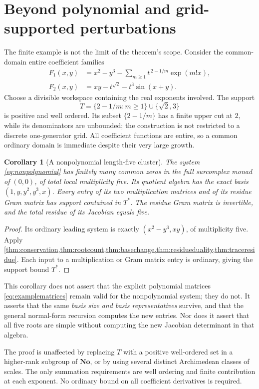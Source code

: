 \documentclass[11pt]{article}
\newtheorem{corollary}[theorem]{Corollary}
\theoremstyle{definition}
\newcommand{\No}{\mathbf{No}}
\begin{document}
\section{Beyond polynomial and grid-supported perturbations}\label{sec:nonpolynomial}
The finite example is not the limit of the theorem's scope. Consider the common-domain entire coefficient families
\begin{align}\label{eq:nonpolynomial}
 F_1(x,y)&=x^2-y^3-
      \sum_{m\ge1}t^{\,2-1/m}\exp(m!x),\\
 F_2(x,y)&=xy-t^{\sqrt2}-t^3\sin(x+y).\nonumber
\end{align}
Choose a divisible workspace containing the real exponents involved. The support
\[
 T=\{2-1/m:m\ge1\}\cup\{\sqrt2,3\}
\]
is positive and well ordered. Its subset $\{2-1/m\}$ has a finite upper cut at $2$, while its denominators are unbounded; the construction is not restricted to a discrete one-generator grid. All coefficient functions are entire, so a common ordinary domain is immediate despite their very large growth.

\begin{corollary}[A nonpolynomial length-five cluster]\label{cor:nonpolynomial}
The system \eqref{eq:nonpolynomial} has finitely many common zeros in the full surcomplex monad of $(0,0)$, of total local multiplicity five. Its quotient algebra has the exact basis $(1,y,y^2,y^3,x)$. Every entry of its two multiplication matrices and of its residue Gram matrix has support contained in $T^*$. The residue Gram matrix is invertible, and the total residue of its Jacobian equals five.
\end{corollary}
\begin{proof}
Its ordinary leading system is exactly $(x^2-y^3,xy)$, of multiplicity five. Apply \cref{thm:conservation,thm:rootcount,thm:basechange,thm:residueduality,thm:traceresidue}. Each input to a multiplication or Gram matrix entry is ordinary, giving the support bound $T^*$.
\end{proof}
This corollary does not assert that the explicit polynomial matrices \eqref{eq:examplematrices} remain valid for the nonpolynomial system; they do not. It asserts that the same \emph{basis size and basis representatives} survive, and that the general normal-form recursion computes the new entries. Nor does it assert that all five roots are simple without computing the new Jacobian determinant in that algebra.

The proof is unaffected by replacing $T$ with a positive well-ordered set in a higher-rank subgroup of $\No$, or by using several distinct Archimedean classes of scales. The only summation requirements are well ordering and finite contribution at each exponent. No ordinary bound on all coefficient derivatives is required.
\end{document}
